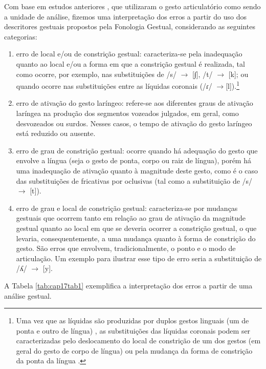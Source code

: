 \documentclass[output=paper,colorlinks,citecolor=brown,booklanguage=portuguese]{langscibook}
\begin{document}
 Com base em estudos anteriores \citep{Goldstein2003, Lieshout2008}, que utilizaram o gesto articulatório como sendo a unidade de análise, fizemos uma interpretação dos erros a partir do uso dos descritores gestuais propostos pela Fonologia Gestual, considerando as seguintes categorias:
\begin{enumerate}[label=\alph*)]
    \item erro de local e/ou de constrição gestual: caracteriza-se pela inadequação quanto ao local e/ou a forma em que a constrição gestual é realizada, tal como ocorre, por exemplo, nas substituições de /s/ $\to$ [∫], /t/ $\to$ [k]; ou quando ocorre nas substituições entre as líquidas coronais (/ɾ/ $\to$[l]).\footnote{ Uma vez que as líquidas são produzidas por duplos gestos linguais (um de ponta e outro de língua) \citep{SilvaBarberena2014, Lima2018}, as substituições das líquidas coronais podem ser caracterizadas pelo deslocamento do local de constrição de um dos gestos (em geral do gesto de corpo de língua) ou pela mudança da forma de constrição da ponta da língua \citep{Esperandino2020}.}
\item  	erro de ativação do gesto laríngeo: refere-se aos diferentes graus de ativação laríngea na produção dos segmentos vozeados julgados, em geral, como desvozeados ou surdos. Nesses casos, o tempo de ativação do gesto laríngeo está reduzido ou ausente.
\item  	erro de grau de constrição gestual: ocorre quando há adequação do gesto que envolve a língua (seja o gesto de ponta, corpo ou raiz de língua), porém há uma inadequação de ativação quanto à magnitude deste gesto, como é o caso das substituições de fricativas por oclusivas (tal como a substituição de /s/ $\to$ [t]).
\item erro de grau e local de constrição gestual: caracteriza-se por mudanças gestuais que ocorrem tanto em relação ao grau de ativação da magnitude gestual quanto ao local em que se deveria ocorrer a constrição gestual, o que levaria, consequentemente, a uma mudança quanto à forma de constrição do gesto. São erros que envolvem, tradicionalmente, o ponto e o modo de articulação. Um exemplo para ilustrar esse tipo de erro seria a substituição de /ʎ/ $\to$ [y].
\end{enumerate}
A Tabela \ref{tab:cap17tab1} exemplifica a interpretação dos erros a partir de uma análise gestual.
\end{document}
